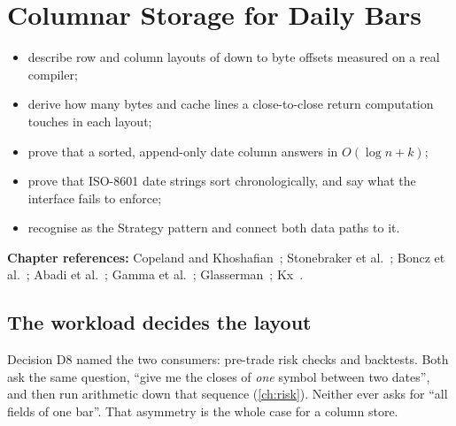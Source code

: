 \chapter{Columnar Storage for Daily Bars}\label{ch:columnar}

\begin{objectives}
\begin{itemize}
\item describe row and column layouts of  down to byte offsets measured on a real compiler;
\item derive how many bytes and cache lines a close-to-close return computation touches in each layout;
\item prove that a sorted, append-only date column answers  in $O(\log n+k)$;
\item prove that ISO-8601 date strings sort chronologically, and say what the interface fails to enforce;
\item recognise  as the Strategy pattern and connect both data paths to it.
\end{itemize}
{\small\color{muted}\textbf{Chapter references:} Copeland and Khoshafian~\cite{copeland1985dsm}; Stonebraker et al.~\cite{stonebraker2005cstore};
Boncz et al.~\cite{boncz2005x100}; Abadi et al.~\cite{abadi2008colrow,abadi2013design}; Gamma et al.~\cite{gamma1994design};
Glasserman~\cite{glasserman2003monte}; Kx~\cite{kxq}.}
\end{objectives}

\section{The workload decides the layout}
Decision D8 named the two consumers: pre-trade risk checks and backtests. Both ask the same question, ``give me the closes
of \emph{one} symbol between two dates'', and then run arithmetic down that sequence (\cref{ch:risk}). Neither ever asks
for ``all fields of one bar''. That asymmetry is the whole case for a column store.



